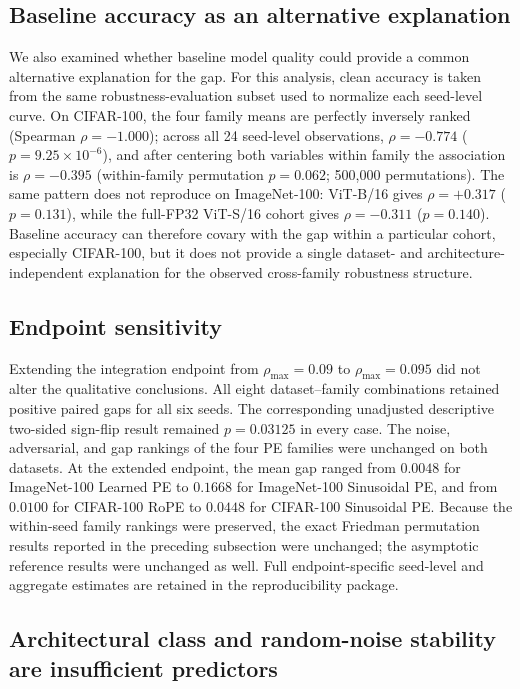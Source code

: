 \documentclass[preprint,12pt,authoryear]{elsarticle}
\begin{document}
\subsection{Baseline accuracy as an alternative explanation}
\label{subsec:clean-accuracy-confound}

We also examined whether baseline model quality could provide a common
alternative explanation for the gap. For this analysis, clean accuracy is
taken from the same robustness-evaluation subset used to normalize each
seed-level curve. On CIFAR-100, the four family means are perfectly inversely
ranked (Spearman $\rho=-1.000$); across all 24 seed-level observations,
$\rho=-0.774$ ($p=9.25\times10^{-6}$), and after centering both variables
within family the association is $\rho=-0.395$ (within-family permutation
$p=0.062$; 500,000 permutations). The same pattern
does not reproduce on ImageNet-100: ViT-B/16 gives $\rho=+0.317$
($p=0.131$), while the full-FP32 ViT-S/16 cohort gives $\rho=-0.311$
($p=0.140$). Baseline accuracy can therefore covary with the gap within a
particular cohort, especially CIFAR-100, but it does not provide a single
dataset- and architecture-independent explanation for the observed
cross-family robustness structure.

\subsection{Endpoint sensitivity}

Extending the integration endpoint from $\rho_{\max}=0.09$ to
$\rho_{\max}=0.095$ did not alter the qualitative conclusions. All
eight dataset--family combinations retained positive paired gaps for
all six seeds. The corresponding unadjusted descriptive two-sided
sign-flip result remained $p=0.03125$ in every case. The noise, adversarial, and gap rankings of
the four PE families were unchanged on both datasets. At the extended
endpoint, the mean gap ranged from $0.0048$ for ImageNet-100 Learned PE
to $0.1668$ for ImageNet-100 Sinusoidal PE, and from $0.0100$ for
CIFAR-100 RoPE to $0.0448$ for CIFAR-100 Sinusoidal PE. Because the
within-seed family rankings were preserved, the exact Friedman
permutation results reported in the preceding subsection were unchanged;
the asymptotic reference results were unchanged as well. Full
endpoint-specific seed-level and aggregate estimates are retained in the
reproducibility package.


\subsection{Architectural class and random-noise stability are
insufficient predictors}
\end{document}
